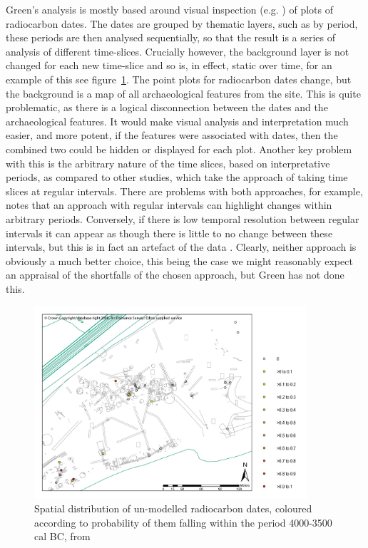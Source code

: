 Green's analysis is mostly based around visual inspection (e.g. \citealp[156]{Green:2008fk}) of plots of radiocarbon dates. The dates are grouped by thematic layers, such as by period, these periods are then analysed sequentially, so that the result is a series of analysis of different time-slices. Crucially however, the background layer is not changed for each new time-slice and so is, in effect, static over time, for an example of this see figure~\ref{fig:green1}. The point plots for radiocarbon dates change, but the background is a map of all archaeological features from the site. This is quite problematic, as there is a logical disconnection between the dates and the archaeological features. It would make visual analysis and interpretation much easier, and more potent, if the features were associated with dates, then the combined two could be hidden or displayed for each plot. Another key problem with this is the arbitrary nature of the time slices, based on interpretative periods, as compared to other studies, which take the approach of taking time slices at regular intervals. There are problems with both approaches, for example, \citet{Crema20101118} notes that an approach with regular intervals can highlight changes within arbitrary periods. Conversely, if there is low temporal resolution between regular intervals it can appear as though there is little to no change between these intervals, but this is in fact an artefact of the data \citep[1121]{Crema20101118}. Clearly, neither approach is obviously a much better choice, this being the case we might reasonably expect an appraisal of the shortfalls of the chosen approach, but Green has not done this. 

\begin{figure}
\centering
	\includegraphics[width=0.9\textwidth,height=0.9\textheight,keepaspectratio=true]{figures/green1}
  \caption{Spatial distribution of un-modelled radiocarbon dates, coloured according to
probability of them falling within the period 4000-3500 cal BC, from \cite{Green:2008fk}}
  \label{fig:green1}
\end{figure}

